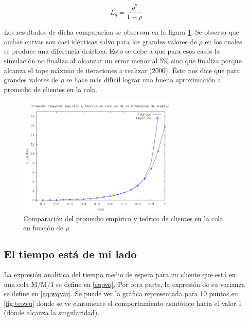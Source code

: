 \documentclass{sig-alternate}
\begin{document}
\begin{equation}
\label{eq:lQTheoretical}
L_q = \dfrac{\rho^{2}}{1 - \rho}
\end{equation}

Los resultados de dicha comparacion se observan en la figura \ref{fig:meanQueueVS}. Se observa que ambas curvas
son casi id\'enticas salvo para los grandes valores de $\rho$ en los cuales se produce una diferencia dr\'astica.
Esto se debe a que para esos casos la simulaci\'on no finaliza al alcanzar un error menor al $5\%$ sino que finaliza
porque alcanza el tope m\'aximo de iteraciones a realizar ($2000$). \'Esto nos dice que para grandes valores de $\rho$
se hace m\'as dif\'icil lograr una buena aproximaci\'on al promedio de clientes en la cola.

\begin{figure}[ht]
\begin{center}
\includegraphics[width=8cm]{teoricoVSempirico}
\caption{\label{fig:meanQueueVS} Comparaci\'on del promedio emp\'irico y te\'orico de clientes en la cola en funci\'on de $\rho$}
\end{center}
\end{figure}

\newpage


\subsection{El tiempo est\'a de mi lado}
\label{sec:parte2}

La expresi\'on anal\'itica del tiempo medio de espera para un cliente que est\'a en una cola M/M/1 se define en \eqref{eq:wq}.
Por otra parte, la expresi\'on de su varianza se define en \eqref{eq:wqvar}.
Se puede ver la gr\'afica representada para 10 puntos en \ref{fig:teowq} donde
se ve claramente el comportamiento asint\'otico hacia el valor 1 (donde alcanza la singularidad).
\end{document}
